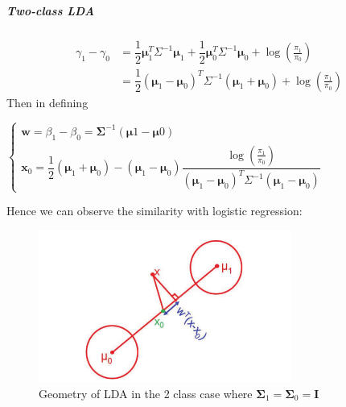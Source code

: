 \subparagraph{Two-class LDA}
\begin{align*}
    \gamma_{1} - \gamma_{0} 
    &= \dfrac{1}{2}\bm{\mu}_{1}^{T}\Sigma^{-1}\bm{\mu}_{1}+
    \dfrac{1}{2}\bm{\mu}_{0}^{T}\Sigma^{-1}\bm{\mu}_{0} +
    \log\left(\frac{\pi_{1}}{\pi_{0}}\right)\\
    &= \dfrac{1}{2}\left(\bm{\mu}_{1} - \bm{\mu}_{0}\right)^{T}\Sigma^{-1}
    \left(\bm{\mu}_{1} + \bm{\mu}_{0}\right) + \log\left(\frac{\pi_{1}}{\pi_{0}}\right)
\end{align*}
Then in defining 
\begin{center}
    $\begin{cases}
        \bm{w} = \beta_{1} - \beta_{0} = \bm{\Sigma}^{-1}\left(\bm{\mu}{1}-\bm{\mu}{0}
        \right)\\
        \bm{x}_{0} = \dfrac{1}{2}\left(\bm{\mu}_{1} + \bm{\mu}_{0}\right) - 
        \left(\bm{\mu}_{1} - \bm{\mu}_{0}\right)\dfrac{\log\left(\frac{\pi_{1}}{\pi_{0}}
        \right)}{\left(\bm{\mu}_{1} - \bm{\mu}_{0}\right)^{T}\Sigma^{-1}
    \left(\bm{\mu}_{1} - \bm{\mu}_{0}\right)}
    \end{cases}$
\end{center}
Hence we can observe the similarity with logistic regression:
\begin{center}
\end{center}
\begin{figure}[H]
    \begin{center}
        \includegraphics[width=.5\textwidth]{./chaps/32_sec/images/2_geometry_lda.png}
    \end{center}
    \caption{Geometry of LDA in the 2 class case where $\bm{\Sigma}_{1} = \bm{\Sigma}_{0}
= \bm{I}$}
    \label{fig:2_geometry_lda}
\end{figure}





